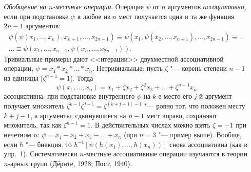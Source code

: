 \begin{solution}[6 (\S\,4)]
\emph{Обобщение на $n$-местные операции.} Операция $\psi$ от $n$
аргументов \emph{ассоциативна}, если при подстановке $\psi$ в любое из $n$
мест получается одна и та же функция $2n-1$ аргументов:
\begin{multline*}
\psi(\psi(x_1,\dots,x_n),x_{n+1},\dots,x_{2n-1})\equiv
\psi(x_1,\psi(x_2,\dots,x_{n+1}),\dots,x_{2n-1})\equiv\dots\\
\dots\equiv\psi(x_1,\dots,x_{n-1},\psi(x_n,\dots,x_{2n-1})).
\end{multline*}
Тривиальные примеры дают <<итерации>> двухместной ассоциативной операции,
$\psi=x_1*x_2*\dots*x_n$. Нетривиальные: пусть $\zeta$ "--- корень
степени $n-1$ из единицы ($\zeta^{n-1}=1$). Тогда
\[
\psi(x_1,\dots,x_n)=x_1+\zeta x_2+\zeta^2x_3+\dots+\zeta^{n-1}x_n
\]
ассоциативна: при подстановке внутреннего $\psi$ на $k$-е место его
$j$-й аргумент получает множитель $\zeta^{k-1}\zeta^{j-1}=\zeta^{(k+j-1)-1}$
"--- ровно тот, что положен месту $k+j-1$, а аргументы, сдвинувшиеся на
$n-1$ мест вправо, сохраняют множитель, так как $\zeta^{n-1}=1$.
В действительных числах можно взять $\zeta=-1$ при нечетном $n$:
$\psi=x_1-x_2+x_3-\dots+x_n$ (при $n=3$ "--- пример выше). Вообще, если
$h$ "--- биекция, то $h^{-1}[\psi(h(x_1),\dots,h(x_n))]$ снова
ассоциативна (как в упр.~1). Систематически $n$-местные ассоциативные
операции изучаются в теории $n$-арных групп (Дёрнте, 1928; Пост, 1940).
\end{solution}

